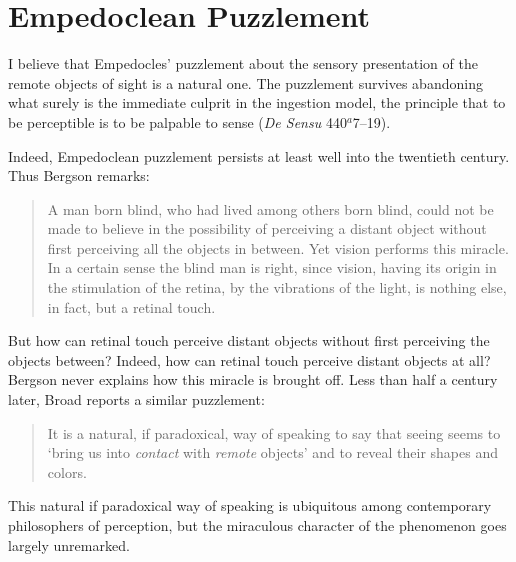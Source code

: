 
\section{Empedoclean Puzzlement} %
\label{sec:empedoclean_puzzlement}

I believe that Empedocles' puzzlement about the sensory presentation of the remote objects of sight is a natural one. The puzzlement survives abandoning what surely is the immediate culprit in the ingestion model, the principle that to be perceptible is to be palpable to sense (\emph{De Sensu} 440\( ^{a} \)7--19). 

Indeed, Empedoclean puzzlement persists at least well into the twentieth century. Thus Bergson remarks:
\begin{quote}
	A man born blind, who had lived among others born blind, could not be made to believe in the possibility of perceiving a distant object without first perceiving all the objects in between. Yet vision performs this miracle. In a certain sense the blind man is right, since vision, having its origin in the stimulation of the retina, by the vibrations of the light, is nothing else, in fact, but a retinal touch. \citep[168]{Bergson:1907sh}
\end{quote}
But how can retinal touch perceive distant objects without first perceiving the objects between? Indeed, how can retinal touch perceive distant objects at all? Bergson never explains how this miracle is brought off. Less than half a century later, Broad reports a similar puzzlement:
\begin{quote}
    It is a natural, if paradoxical, way of speaking to say that seeing seems to `bring us into \emph{contact} with \emph{remote} objects' and to reveal their shapes and colors. \citep[33]{Broad:1952kx}
\end{quote}
This natural if paradoxical way of speaking is ubiquitous among contemporary philosophers of perception, but the miraculous character of the phenomenon goes largely unremarked.


